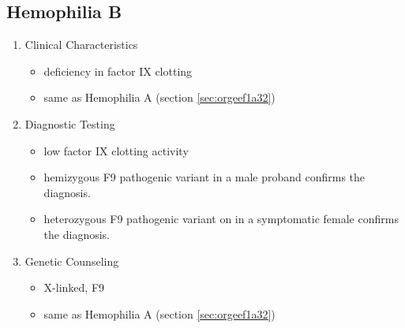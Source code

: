 \documentclass[12pt]{scrartcl}
\begin{document}
\subsection{Hemophilia B}
\label{sec:org5d9b347}
\begin{enumerate}
\item Clinical Characteristics
\label{sec:orgbd11423}
\begin{itemize}
\item deficiency in factor IX clotting
\item same as Hemophilia A (section \ref{sec:orgeef1a32})
\end{itemize}
\item Diagnostic Testing
\label{sec:orga54bc4a}
\begin{itemize}
\item low factor IX clotting activity
\item hemizygous F9 pathogenic variant in a male proband confirms the
diagnosis.
\item heterozygous F9 pathogenic variant on in a symptomatic female
confirms the diagnosis.
\end{itemize}
\item Genetic Counseling
\label{sec:org4df5118}
\begin{itemize}
\item X-linked, F9
\item same as Hemophilia A (section \ref{sec:orgeef1a32})
\end{itemize}
\end{enumerate}
\end{document}
